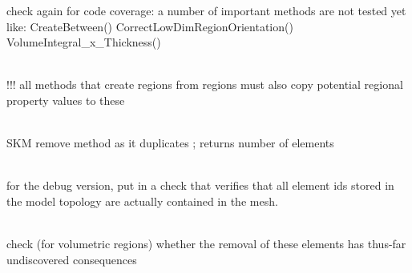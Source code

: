 \begin{DoxyRefList}
\label{todo__todo000265}%
%
check again for code coverage\+: a number of important methods are not tested yet like\+: Create\+Between() Correct\+Low\+Dim\+Region\+Orientation() Volume\+Integral\+\_\+x\+\_\+\+Thickness() 
\item[Class \doxylink{classcsmp_1_1_region_interface}{csmp\+::Region\+Interface\texorpdfstring{$<$}{<} dim, REGION\+\_\+\+COMPLEX \texorpdfstring{$>$}{>}} ]\hfill \\
\label{todo__todo000014}%
%
!!! all methods that create regions from regions must also copy potential regional property values to these 
\item[Member \doxylink{classcsmp_1_1_region_interface_ad6d52661a17c12ab621263e9ff377462}{csmp\+::Region\+Interface\texorpdfstring{$<$}{<} dim, REGION\+\_\+\+COMPLEX \texorpdfstring{$>$}{>}\+::Form\+Region\+From} (const char \texorpdfstring{$\ast$}{*}regionname, const std\+::set$<$ std\+::string $>$ \&region\+\_\+names)]\hfill \\
\label{todo__todo000015}%
%
SKM remove method as it duplicates ; returns number of elements  
\item[Member \doxylink{classcsmp_1_1_region_interface_aefd55525755bb027d8b6204b2ce604c3}{csmp\+::Region\+Interface\texorpdfstring{$<$}{<} dim, REGION\+\_\+\+COMPLEX \texorpdfstring{$>$}{>}\+::Form\+Regions\+From} (const \doxylink{classcsmp_1_1_model_topology}{Model\+Topology} \&, bool ignore\+\_\+domain\+\_\+type\+\_\+identifiers=false)]\hfill \\
\label{todo__todo000184}%
%
for the debug version, put in a check that verifies that all element ids stored in the model topology are actually contained in the mesh.  
\item[Member \doxylink{classcsmp_1_1_region_interface_afdc209398fea9597da430153ace32208}{csmp\+::Region\+Interface\texorpdfstring{$<$}{<} dim, REGION\+\_\+\+COMPLEX \texorpdfstring{$>$}{>}\+::Remove\+From\+Region} (const char \texorpdfstring{$\ast$}{*}region, const char \texorpdfstring{$\ast$}{*}region\+\_\+to\+\_\+subtract)]\hfill \\
\label{todo__todo000186}%
%
check (for volumetric regions) whether the removal of these elements has thus-\/far undiscovered consequences 
\item[Member \doxylink{classcsmp_1_1_region_interface_a830b59da55e4235995ebfc6affa254e6}{csmp\+::Region\+Interface\texorpdfstring{$<$}{<} dim, REGION\+\_\+\+COMPLEX \texorpdfstring{$>$}{>}\+::Remove\+Region\+Partitions\+For} (const char \texorpdfstring{$\ast$}{*}name)]\hfill \\

\end{DoxyRefList}
